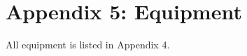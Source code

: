 \documentclass[11pt,titlepage]{report}
\begin{document}
{\section*{Appendix 5: Equipment}


\vspace{2ex}
\noindent
All equipment is listed in Appendix 4.

\clearpage
{}




%
%
%
%
%
%
%
%
%
%
%
%
%
%
%
%
%   

}
\end{document}
